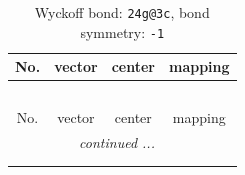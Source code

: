 \documentclass[fleqn,8pt]{jsarticle}
\begin{document}
\renewcommand{\arraystretch}{1.2}
\begin{longtable}{cccc}
\caption{Wyckoff bond: {\tt 24g@3c}, bond symmetry: {\tt -1}}
 \\
 \hline \hline
No. & vector & center & mapping \\ \hline \endfirsthead

\multicolumn{3}{l}{\tablename\ \thetable{}} \\
 \hline \hline
No. & vector & center & mapping \\ \hline \endhead

 \hline \hline
\multicolumn{3}{r}{\footnotesize\it continued ...} \\ \endfoot

 \hline \hline
\multicolumn{3}{r}{} \\ \endlastfoot


\end{longtable}
\end{document}
